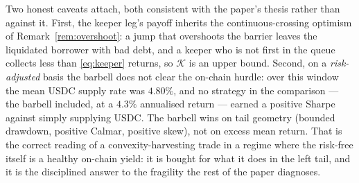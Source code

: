 Two honest caveats attach, both consistent with the paper's thesis rather than against it. First,
the keeper leg's payoff inherits the continuous-crossing optimism of Remark~\ref{rem:overshoot}: a
jump that overshoots the barrier leaves the liquidated borrower with bad debt, and a keeper who is
not first in the queue collects less than \eqref{eq:keeper} returns, so $\mathcal K$ is an upper
bound. Second, on a \emph{risk-adjusted} basis the barbell does not clear the on-chain hurdle: over
this window the mean USDC supply rate was $4.80\%$, and no strategy in the comparison --- the barbell
included, at a $4.3\%$ annualised return --- earned a positive Sharpe against simply supplying USDC.
The barbell wins on tail geometry (bounded drawdown, positive Calmar, positive skew), not on excess
mean return. That is the correct reading of a convexity-harvesting trade in a regime where the
risk-free itself is a healthy on-chain yield: it is bought for what it does in the left tail, and it
is the disciplined answer to the fragility the rest of the paper diagnoses.
